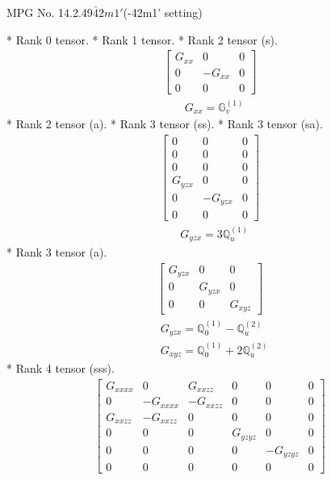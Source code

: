 \documentclass[fleqn,8pt,landscape]{jsarticle}
\begin{document}
\setcounter{MaxMatrixCols}{32}

\renewcommand{\tablename}{Table~}
\renewcommand{\figurename}{Figure~}
\begin{center}
\LARGE
MPG No. 14.2.49\quad$\bar{4}2m1'$\quad(-42m1' setting)
\end{center}
* Rank 0 tensor.
* Rank 1 tensor.
* Rank 2 tensor (s).
\begin{align*}
\begin{bmatrix} G_{xx} & 0 & 0 \\ 0 & - G_{xx} & 0 \\ 0 & 0 & 0 \end{bmatrix}
\end{align*}
\begin{align*}
& G_{xx} = \mathbb{G}_{v}^{(1)}
\end{align*}
* Rank 2 tensor (a).
* Rank 3 tensor (ss).
* Rank 3 tensor (sa).
\begin{align*}
\begin{bmatrix} 0 & 0 & 0 \\ 0 & 0 & 0 \\ 0 & 0 & 0 \\ G_{yzx} & 0 & 0 \\ 0 & - G_{yzx} & 0 \\ 0 & 0 & 0 \end{bmatrix}
\end{align*}
\begin{align*}
& G_{yzx} = 3 \mathbb{Q}_{u}^{(1)}
\end{align*}
* Rank 3 tensor (a).
\begin{align*}
\begin{bmatrix} G_{yzx} & 0 & 0 \\ 0 & G_{yzx} & 0 \\ 0 & 0 & G_{xyz} \end{bmatrix}
\end{align*}
\begin{align*}
& G_{yzx} = \mathbb{Q}_{0}^{(1)} - \mathbb{Q}_{u}^{(2)} \\
& G_{xyz} = \mathbb{Q}_{0}^{(1)} + 2 \mathbb{Q}_{u}^{(2)}
\end{align*}
* Rank 4 tensor (sss).
\begin{align*}
\begin{bmatrix} G_{xxxx} & 0 & G_{xxzz} & 0 & 0 & 0 \\ 0 & - G_{xxxx} & - G_{xxzz} & 0 & 0 & 0 \\ G_{xxzz} & - G_{xxzz} & 0 & 0 & 0 & 0 \\ 0 & 0 & 0 & G_{yzyz} & 0 & 0 \\ 0 & 0 & 0 & 0 & - G_{yzyz} & 0 \\ 0 & 0 & 0 & 0 & 0 & 0 \end{bmatrix}
\end{align*}
\end{document}
